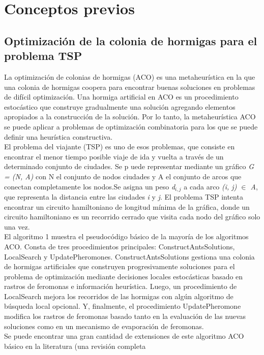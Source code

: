 \chapter{Conceptos previos}\label{cap:conceptos}

\section{Optimizaci\'on de la colonia de hormigas para el problema TSP}
La optimizaci\'on de colonias de hormigas (ACO) es una metaheur\'istica en la que una colonia de hormigas coopera para encontrar buenas soluciones en problemas de dif\'icil optimizaci\'on. Una hormiga artificial en ACO es un procedimiento estoc\'astico que construye gradualmente una soluci\'on agregando elementos apropiados a la construcci\'on de la soluci\'on. Por lo tanto, la metaheur\'istica ACO se puede aplicar a problemas de optimizaci\'on combinatoria para los que se puede definir una heur\'istica constructiva.\\
El problema del viajante (TSP) es uno de esos problemas, que consiste en encontrar el menor tiempo posible viaje de ida y vuelta a trav\'es de un determinado conjunto de ciudades. Se p uede representar mediante un gr\'afico \textit{G = (N, A)} con N el conjunto de nodos ciudades y A el conjunto de arcos que conectan completamente los nodos.Se asigna un peso \textit{d$_{i,j}$} a cada arco \textit{(i, j) $\in$ A}, que representa la distancia entre las ciudades \textit{i} y \textit{j}. El problema TSP intenta encontrar un circuito hamiltoniano de longitud m\'inima de la gr\'afica, donde un circuito hamiltoniano es un recorrido cerrado que visita cada nodo del gr\'afico solo una vez.\\
El algoritmo 1 muestra el pseudoc\'odigo b\'asico de la mayor\'ia de los algoritmos ACO. Consta de tres procedimientos principales: ConstructAntsSolutions, LocalSearch y UpdatePheromones. ConstructAntsSolutions gestiona una colonia de hormigas artificiales que construyen progresivamente soluciones para el problema de optimizaci\'on mediante decisiones locales estoc\'asticas basado en rastros de feromonas e informaci\'on heur\'istica. Luego, un procedimiento de LocalSearch mejora los recorridos de las hormigas con alg\'un algoritmo de b\'usqueda local opcional. Y, finalmente, el procedimiento UpdatePheromone modifica los rastros de feromonas basado tanto en la evaluaci\'on de las nuevas soluciones como en un mecanismo de evaporaci\'on de feromonas.\\
Se puede encontrar una gran cantidad de extensiones de este algoritmo ACO b\'asico en la literatura (una revisi\'on completa
